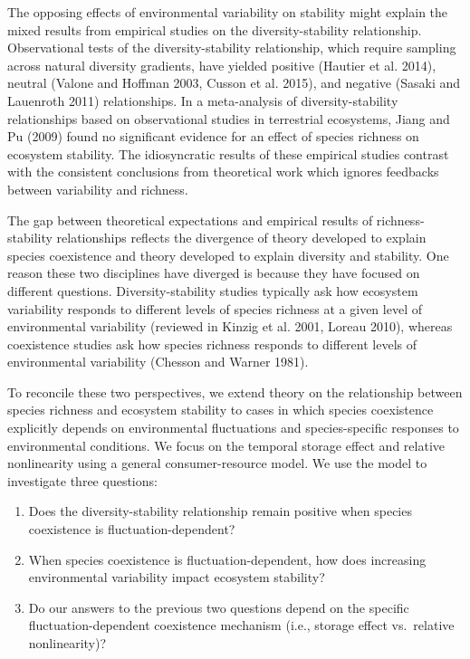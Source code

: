 \documentclass[12pt,]{article}
\begin{document}
The opposing effects of environmental variability on stability might
explain the mixed results from empirical studies on the
diversity-stability relationship. Observational tests of the
diversity-stability relationship, which require sampling across natural
diversity gradients, have yielded positive (Hautier et al. 2014),
neutral (Valone and Hoffman 2003, Cusson et al. 2015), and negative
(Sasaki and Lauenroth 2011) relationships. In a meta-analysis of
diversity-stability relationships based on observational studies in
terrestrial ecosystems, Jiang and Pu (2009) found no significant
evidence for an effect of species richness on ecosystem stability. The
idiosyncratic results of these empirical studies contrast with the
consistent conclusions from theoretical work which ignores feedbacks
between variability and richness.

The gap between theoretical expectations and empirical results of
richness-stability relationships reflects the divergence of theory
developed to explain species coexistence and theory developed to explain
diversity and stability. One reason these two disciplines have diverged
is because they have focused on different questions. Diversity-stability
studies typically ask how ecosystem variability responds to different
levels of species richness at a given level of environmental variability
(reviewed in Kinzig et al. 2001, Loreau 2010), whereas coexistence
studies ask how species richness responds to different levels of
environmental variability (Chesson and Warner 1981).

To reconcile these two perspectives, we extend theory on the
relationship between species richness and ecosystem stability to cases
in which species coexistence explicitly depends on environmental
fluctuations and species-specific responses to environmental conditions.
We focus on the temporal storage effect and relative nonlinearity using
a general consumer-resource model. We use the model to investigate three
questions:

\begin{enumerate}
\def\labelenumi{\arabic{enumi}.}
\item
  Does the diversity-stability relationship remain positive when species
  coexistence is fluctuation-dependent?
\item
  When species coexistence is fluctuation-dependent, how does increasing
  environmental variability impact ecosystem stability?
\item
  Do our answers to the previous two questions depend on the specific
  fluctuation-dependent coexistence mechanism (i.e., storage effect
  vs.~relative nonlinearity)?
\end{enumerate}
\end{document}
